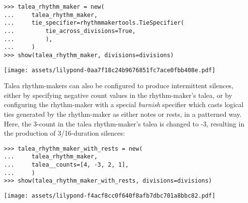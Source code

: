 \begin{comment}
<abjad>
talea_rhythm_maker = new(
    talea_rhythm_maker,
    tie_specifier=rhythmmakertools.TieSpecifier(
        tie_across_divisions=True,
        ),
    )
show(talea_rhythm_maker, divisions=divisions)
</abjad>
\end{comment}

\begin{abjadbookoutput}
\begin{singlespacing}
\vspace{-0.5\baselineskip}
\begin{lstlisting}
>>> talea_rhythm_maker = new(
...     talea_rhythm_maker,
...     tie_specifier=rhythmmakertools.TieSpecifier(
...         tie_across_divisions=True,
...         ),
...     )
>>> show(talea_rhythm_maker, divisions=divisions)
\end{lstlisting}
\noindent\texttt{[image: assets/lilypond-0aa7f18c24b9676851fc7ace0fbb408e.pdf]}
\end{singlespacing}
\end{abjadbookoutput}

\noindent Talea rhythm-makers can also be configured to produce intermittent
silences, either by specifying negative count values in the rhythm-maker's
talea, or by configuring the rhythm-maker with a special \emph{burnish}
specifier which casts logical ties generated by the rhythm-maker as either
notes or rests, in a patterned way. Here, the 3-count in the talea
rhythm-maker's talea is changed to -3, resulting in the production of
3/16-duration silences:

\begin{comment}
<abjad>
talea_rhythm_maker_with_rests = new(
    talea_rhythm_maker,
    talea__counts=[4, -3, 2, 1],
    )
show(talea_rhythm_maker_with_rests, divisions=divisions)
</abjad>
\end{comment}

\begin{abjadbookoutput}
\begin{singlespacing}
\vspace{-0.5\baselineskip}
\begin{lstlisting}
>>> talea_rhythm_maker_with_rests = new(
...     talea_rhythm_maker,
...     talea__counts=[4, -3, 2, 1],
...     )
>>> show(talea_rhythm_maker_with_rests, divisions=divisions)
\end{lstlisting}
\noindent\texttt{[image: assets/lilypond-f4acf8cc0f640f8afb7dbc701a8bbc82.pdf]}
\end{singlespacing}
\end{abjadbookoutput}

